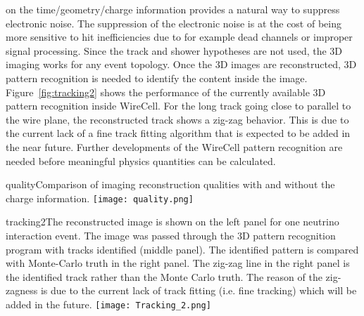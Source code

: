 on the time/geometry/charge information provides a natural way to suppress electronic noise.
The suppression of the electronic noise is at the cost of being more
sensitive to hit inefficiencies due to for example dead channels or improper signal processing.
 Since the track and shower hypotheses
are not used, the 3D imaging works for any event topology. Once the 3D
images are reconstructed, 3D pattern recognition is needed to identify 
the content inside the image. Figure~\ref{fig:tracking2} shows the 
performance of the currently available 3D pattern recognition inside
WireCell. For the long track going close to parallel to the wire plane, the reconstructed
track shows a zig-zag behavior. This is due to the current lack of a fine track fitting algorithm
that is expected to be added in the near future. 
Further developments of the WireCell pattern recognition 
are needed before meaningful physics quantities can be calculated.
%
\begin{cdrfigure}{quality}{Comparison of imaging reconstruction 
qualities with and without the charge information. }
\texttt{[image: quality.png]}
\end{cdrfigure}
%
%
\begin{cdrfigure}{tracking2}{The reconstructed image is shown 
on the left panel for one neutrino interaction event. The image 
was passed through the 3D pattern recognition program with tracks 
identified (middle panel). The identified pattern is compared 
with Monte-Carlo truth in the right panel. The zig-zag line in the right 
panel is the identified track rather than the Monte Carlo truth. 
The reason of the zig-zagness is due to the current lack of track fitting 
(i.e. fine tracking) which will be added in the future. }
 \texttt{[image: Tracking\_2.png]}
\end{cdrfigure}


